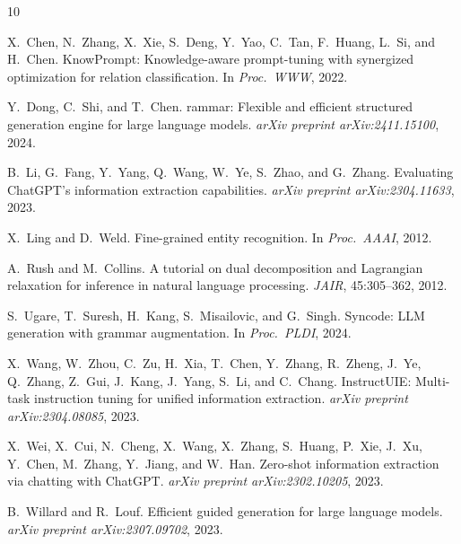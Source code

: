 \documentclass[11pt,a4paper]{article}
\begin{document}

\begin{thebibliography}{10}

X.~Chen, N.~Zhang, X.~Xie, S.~Deng, Y.~Yao, C.~Tan, F.~Huang, L.~Si, and H.~Chen.
\newblock Know{P}rompt: Knowledge-aware prompt-tuning with synergized optimization for relation classification.
\newblock In \emph{Proc.\ WWW}, 2022.

Y.~Dong, C.~Shi, and T.~Chen.
rammar: Flexible and efficient structured generation engine for large language models.
\newblock \emph{arXiv preprint arXiv:2411.15100}, 2024.

B.~Li, G.~Fang, Y.~Yang, Q.~Wang, W.~Ye, S.~Zhao, and G.~Zhang.
\newblock Evaluating {ChatGPT}'s information extraction capabilities.
\newblock \emph{arXiv preprint arXiv:2304.11633}, 2023.

X.~Ling and D.~Weld.
\newblock Fine-grained entity recognition.
\newblock In \emph{Proc.\ AAAI}, 2012.

A.~Rush and M.~Collins.
\newblock A tutorial on dual decomposition and {L}agrangian relaxation for inference in natural language processing.
\newblock \emph{JAIR}, 45:305--362, 2012.

S.~Ugare, T.~Suresh, H.~Kang, S.~Misailovic, and G.~Singh.
\newblock Syncode: {LLM} generation with grammar augmentation.
\newblock In \emph{Proc.\ PLDI}, 2024.

X.~Wang, W.~Zhou, C.~Zu, H.~Xia, T.~Chen, Y.~Zhang, R.~Zheng, J.~Ye, Q.~Zhang, Z.~Gui, J.~Kang, J.~Yang, S.~Li, and C.~Chang.
\newblock Instruct{UIE}: Multi-task instruction tuning for unified information extraction.
\newblock \emph{arXiv preprint arXiv:2304.08085}, 2023.

X.~Wei, X.~Cui, N.~Cheng, X.~Wang, X.~Zhang, S.~Huang, P.~Xie, J.~Xu, Y.~Chen, M.~Zhang, Y.~Jiang, and W.~Han.
\newblock Zero-shot information extraction via chatting with {ChatGPT}.
\newblock \emph{arXiv preprint arXiv:2302.10205}, 2023.

B.~Willard and R.~Louf.
\newblock Efficient guided generation for large language models.
\newblock \emph{arXiv preprint arXiv:2307.09702}, 2023.

\end{thebibliography}
\end{document}
